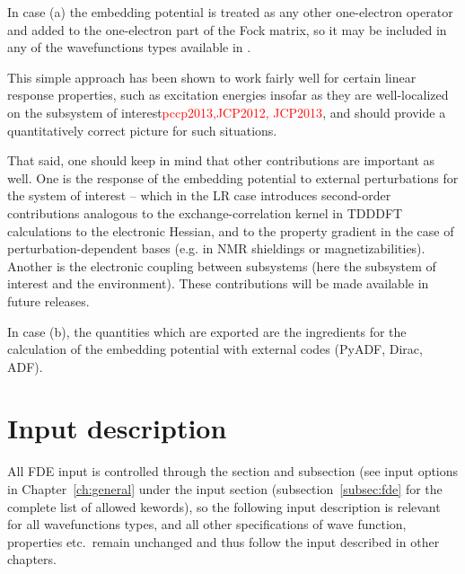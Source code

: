 In case (a) the embedding potential is treated as any other one-electron operator and added to the
one-electron part of the Fock matrix, so it may be included in any of the wavefunctions types
available in {\dalton}. 

This simple approach has been shown to work fairly well for certain linear response properties, such as 
excitation energies insofar as they are well-localized on the subsystem of interest\textcolor{red}{pccp2013,JCP2012, JCP2013},
and should provide a quantitatively correct picture for such situations.

That said, one should keep in mind that other contributions are important as well. One is the response of the embedding potential 
to external perturbations for the system of interest -- which in the LR case introduces second-order contributions analogous 
to the exchange-correlation kernel in TDDDFT calculations to the electronic Hessian, and to the property gradient in the 
case of perturbation-dependent bases (e.g. in NMR shieldings or magnetizabilities). Another is the electronic coupling 
between subsystems (here the subsystem of interest and the environment). These contributions will be made available in future 
releases.

In case (b), the quantities which are exported are the ingredients for the calculation of the embedding potential with
external codes (PyADF, Dirac, ADF). 

\section{Input description}

All FDE input is controlled through the  section and  subsection (see input options in 
Chapter~\ref{ch:general} under the  input section (subsection~\ref{subsec:fde} for the complete list of 
allowed kewords), so the following input description is relevant for all wavefunctions types, and all other 
specifications of wave function, properties etc.\ remain unchanged and thus follow the input described in 
other chapters. 


